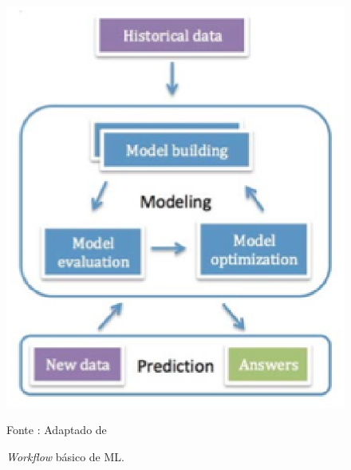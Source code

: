     \begin{figure}[ht]
            \centering
            \label{fig09}
                \includegraphics[keepaspectratio=true, scale=0.7]{editaveis/images/mlworkflow.eps}
            \caption{\textit{Workflow} básico de ML.}
            Fonte : Adaptado de \cite{brink2015}
    \end{figure}

